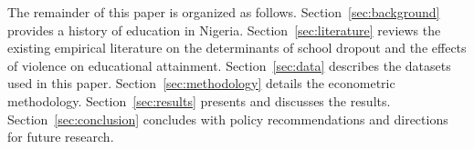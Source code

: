 The remainder of this paper is organized as follows. Section~\ref{sec:background}
provides a history of education in Nigeria. Section~\ref{sec:literature}
reviews the existing empirical literature on the determinants of school
dropout and the effects of violence on educational attainment.
Section~\ref{sec:data} describes the datasets used in this paper.
Section~\ref{sec:methodology} details the econometric methodology.
Section~\ref{sec:results} presents and discusses the results.
Section~\ref{sec:conclusion} concludes with policy recommendations and
directions for future research.
